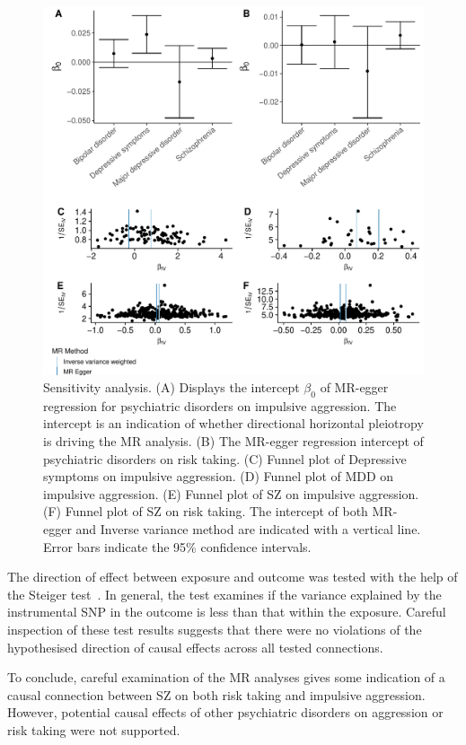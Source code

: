 \begin{figure}[htpb]
  \centering
  \includegraphics[width=0.9\linewidth]{ukb_psychiatric/figures/sensitvity_plot.pdf}
  \caption[Sensitivity analysis]{Sensitivity analysis.
    (A) Displays the intercept $\beta_0$ of MR-egger regression for psychiatric disorders on impulsive aggression. The intercept is an indication of whether directional horizontal pleiotropy is driving the MR analysis.
    (B) The MR-egger regression intercept of psychiatric disorders on risk taking.
    (C) Funnel plot of Depressive symptoms on impulsive aggression. 
    (D) Funnel plot of MDD on impulsive aggression. 
    (E) Funnel plot of SZ on impulsive aggression. 
    (F) Funnel plot of SZ on risk taking. 
    The intercept of both MR-egger and Inverse variance method are indicated with a vertical line.
    Error bars indicate the 95\% confidence intervals.
  }\label{fig:sensitivity}
\end{figure}

The  direction of effect between exposure and outcome was tested with the help of the Steiger test~\cite{Steiger1980}.
In general, the test examines if the variance explained by the  instrumental SNP in the outcome is less than that within the exposure. 
Careful inspection of these test results suggests that there were no violations of the hypothesised direction of causal effects across all tested connections.

To conclude, careful examination of the  MR analyses gives some indication of a causal connection between SZ on both risk taking and impulsive aggression.
However, potential causal effects of other psychiatric disorders on aggression or risk taking were not supported.
